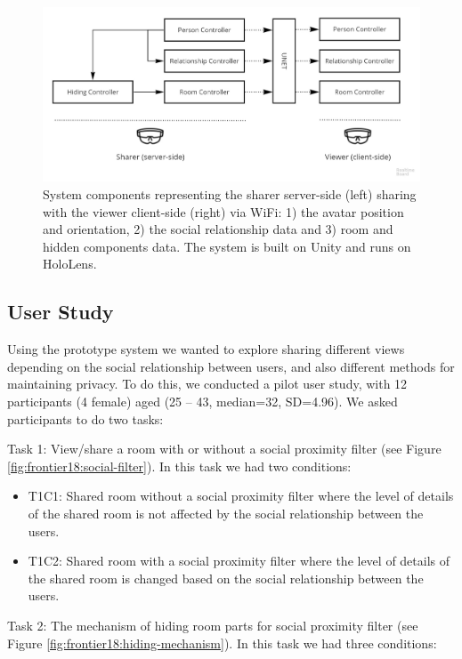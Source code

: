 \begin{figure}
\begin{center}
\includegraphics[width=\linewidth]{images/frontier18/system.jpg}
\caption{System components representing the sharer server-side (left) sharing with the viewer client-side (right) via WiFi: 1) the avatar position and orientation, 2) the social relationship data and 3) room and hidden components data. The system is built on Unity and runs on HoloLens.}\label{fig:frontier18:system}
\end{center}
\end{figure}

\subsection{User Study}

Using the prototype system we wanted to explore sharing different views depending on the social relationship between users, and also different methods for maintaining privacy. To do this, we conducted a pilot user study, with 12 participants (4 female) aged (25 – 43, median=32, SD=4.96). 
We asked participants to do two tasks: 

Task 1: View/share a room with or without a social proximity filter (see Figure \ref{fig:frontier18:social-filter}). In this task we had two conditions: 

\begin{itemize}
\item T1C1: Shared room without a social proximity filter where the level of details of the shared room is not affected by the social relationship between the users.
\item T1C2: Shared room with a social proximity filter where the level of details of the shared room is changed based on the social relationship between the users. 
\end{itemize}

Task 2:  The mechanism of hiding room parts for social proximity filter (see Figure \ref{fig:frontier18:hiding-mechanism}). In this task we had three conditions:

